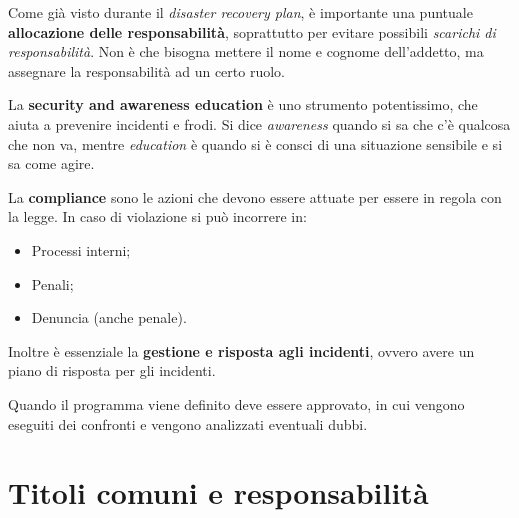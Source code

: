 Come già visto durante il \textit{disaster recovery plan}, è importante una
puntuale \textbf{allocazione delle responsabilità}, soprattutto per evitare
possibili \emph{scarichi di responsabilità}. Non è che bisogna mettere il nome
e cognome dell'addetto, ma assegnare la responsabilità ad un certo ruolo.

La \textbf{security and awareness education} è uno strumento potentissimo, che
aiuta a prevenire incidenti e frodi. Si dice \textit{awareness} quando si sa
che c'è qualcosa che non va, mentre \textit{education} è quando si è consci di
una situazione sensibile e si sa come agire.

La \textbf{compliance} sono le azioni che devono essere attuate per
essere in regola con la legge. In caso di violazione si può incorrere in:
\begin{itemize}
  \item Processi interni;
  \item Penali;
  \item Denuncia (anche penale).
\end{itemize}
Inoltre è essenziale la \textbf{gestione e risposta agli incidenti},
ovvero avere un piano di risposta per gli incidenti.

Quando il programma viene definito deve essere approvato, in cui vengono
eseguiti dei confronti e vengono analizzati eventuali dubbi.

\section{Titoli comuni e responsabilità}

